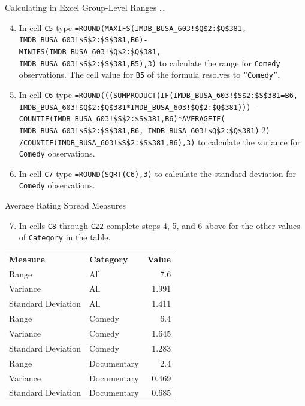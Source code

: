 \documentclass[pdf]{beamer}
\theoremstyle{remark}
\theoremstyle{definition}
\begin{document}
\begin{frame}[t]{Calculating in Excel Group-Level Ranges \ldots}
\small
\begin{enumerate}
\setcounter{enumi}{3}
\item In cell \texttt{C5} type \texttt{=ROUND(MAXIFS(IMDB\_BUSA\_603!\$Q\$2:\$Q\$381, \\ IMDB\_BUSA\_603!\$S\$2:\$S\$381,B6)- \\ MINIFS(IMDB\_BUSA\_603!\$Q\$2:\$Q\$381, \\ IMDB\_BUSA\_603!\$S\$2:\$S\$381,B5),3)} to calculate the range for \texttt{Comedy} observations. The cell value for \texttt{B5} of the formula resolves to \texttt{``Comedy''}.
\item In cell \texttt{C6} type \texttt{=ROUND(((SUMPRODUCT(IF(IMDB\_BUSA\_603!\$S\$2:\$S\$381=B6,
IMDB\_BUSA\_603!\$Q\$2:\$Q\$381*IMDB\_BUSA\_603!\$Q\$2:\$Q\$381)))
-COUNTIF(IMDB\_BUSA\_603!\$S\$2:\$S\$381,B6)*AVERAGEIF(
IMDB\_BUSA\_603!\$S\$2:\$S\$381,B6,
IMDB\_BUSA\_603!\$Q\$2:\$Q\$381)$\hat{}\;2$)
/COUNTIF(IMDB\_BUSA\_603!\$S\$2:\$S\$381,B6),3)}
 to calculate the variance for \texttt{Comedy} observations.  
\item In cell \texttt{C7} type \texttt{=ROUND(SQRT(C6),3)} to calculate the standard deviation for \texttt{Comedy} observations.
\end{enumerate}
\end{frame}

\begin{frame}[t]{Average Rating Spread Measures}
\begin{enumerate}
  \setcounter{enumi}{6}
\item In cells \texttt{C8} through \texttt{C22} complete steps 4, 5, and 6 above for the other values of \texttt{Category} in the table. \\
\vspace{1.5ex}
\end{enumerate}
\begin{table}[htbp]
  \centering
    \captionsetup{justification=centering}
    \begin{tabular}{llr}
    \rowcolor[rgb]{ .851,  .882,  .949} \textbf{Measure} & \textbf{Category} & \multicolumn{1}{l}{\textbf{Value}} \\
    Range & All   & 7.6 \\
    Variance & All   & 1.991 \\
    Standard Deviation & All   & 1.411 \\
    Range & Comedy & 6.4 \\
    Variance & Comedy & 1.645 \\
    Standard Deviation & Comedy & 1.283 \\
    Range & Documentary & 2.4 \\
    Variance & Documentary & 0.469 \\
    Standard Deviation & Documentary & 0.685 \\
    \end{tabular}%
\end{table}%
\end{frame}
\end{document}
